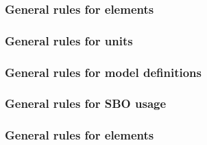 \begin{sbmlenum}
\end{sbmlenum} \subsubsection*{General rules for  elements} \begin{sbmlenum}


\end{sbmlenum} \subsubsection*{General rules for units} \begin{sbmlenum}


\end{sbmlenum} \subsubsection*{General rules for model definitions} \begin{sbmlenum}


\end{sbmlenum} \subsubsection*{General rules for SBO usage} \begin{sbmlenum}


\end{sbmlenum} \subsubsection*{General rules for  elements} \begin{sbmlenum}


\end{sbmlenum}
